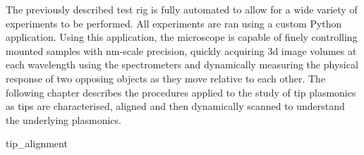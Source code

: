 \documentclass{book}
\begin{document}

The previously described test rig is fully automated to allow for a wide variety of experiments to be performed. All experiments are ran using a custom Python application. Using this application, the microscope is capable of finely controlling mounted samples with nm-scale precision, quickly acquiring 3d image volumes at each wavelength using the spectrometers and dynamically measuring the physical response of two opposing objects as they move relative to each other. The following chapter describes the procedures applied to the study of tip plasmonics as tips are characterised, aligned and then dynamically scanned to understand the underlying plasmonics.

{tip_alignment}
\end{document}
